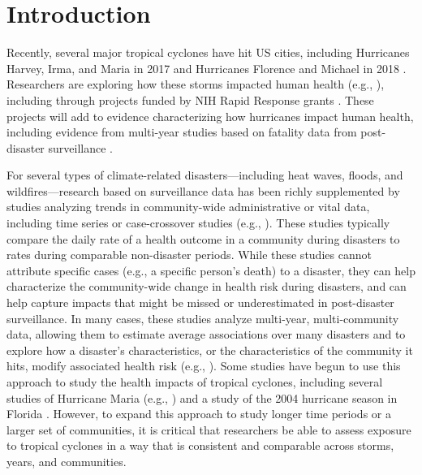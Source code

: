 \section*{Introduction}

\acresetall

Recently, several major tropical cyclones have hit \ac{US} cities, including
Hurricanes Harvey, Irma, and Maria in 2017 \parencite{blake20182017} and
Hurricanes Florence and Michael in 2018 \parencite{avila20192018}. Researchers
are exploring how these storms impacted human health (e.g.,
\parencite{santos2018use, rivera2018estimating, santos2018differential,
grineski2019impact, issa2018deaths, tanz2019notes, paul2019brief}), including
through projects funded by \ac{NIH} Rapid Response grants
\parencite{nihreporter}. These projects will add to evidence characterizing how
hurricanes impact human health, including evidence from multi-year studies
based on fatality data from post-disaster surveillance
\parencite{rappaport2000, rappaport2014fatalities, rappaport2016fatalities,
czajkowski2010fatal, czajkowski2011, moore2012}.

For several types of climate-related disasters---including heat waves, floods,
and wildfires---research based on surveillance data has been richly
supplemented by studies analyzing trends in community-wide administrative or
vital data, including time series or case-crossover studies (e.g.,
\cite{anderson2010heat, son2012impact, haikerwal2015impact, liu2017wildfire,
milojevic2017mental}).  These studies typically compare the daily rate of a
health outcome in a community during disasters to rates during comparable
non-disaster periods.  While these studies cannot attribute specific cases
(e.g., a specific person's death) to a disaster, they can help characterize the
community-wide change in health risk during disasters, and can help capture
impacts that might be missed or underestimated in post-disaster surveillance.
In many cases, these studies analyze multi-year, multi-community data, allowing
them to estimate average associations over many disasters and to explore how a
disaster's characteristics, or the characteristics of the community it hits,
modify associated health risk (e.g., \cite{anderson2010heat, son2012impact,
liu2017wildfire}).  Some studies have begun to use this approach to study the
health impacts of tropical cyclones, including several studies of Hurricane
Maria (e.g., \cite{santos2018use, santos2018differential}) and a study of the
2004 hurricane season in Florida \parencite{mckinney2011}.  However, to expand
this approach to study longer time periods or a larger set of communities, it
is critical that researchers be able to assess exposure to tropical cyclones in
a way that is consistent and comparable across storms, years, and communities.  

